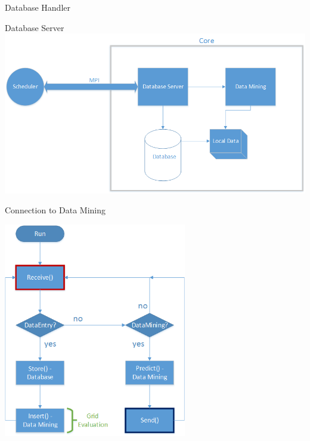 \begin{frame}{Database Handler}
	\end{frame}
	
	\begin{frame}{Database Server}
	\includegraphics[width=1.0\textwidth]{images/databaseserver.png}
	\end{frame}
	
	
	
	\begin{frame}{Connection to Data Mining}
		\begin{center}
	\includegraphics[height=0.64\textwidth, width=0.6\textwidth]{images/datamining_flow2.png}
	\end{center}
	\end{frame}
